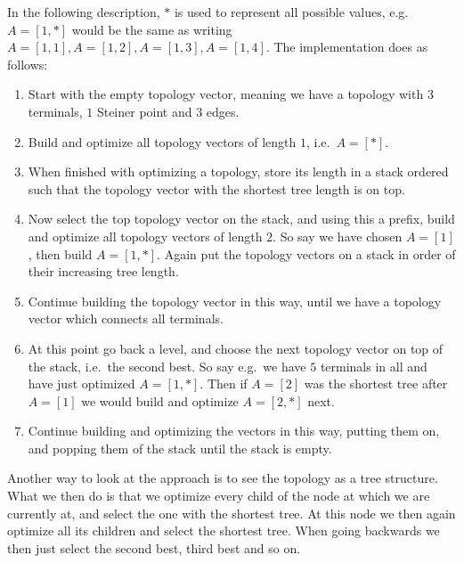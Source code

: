 In the following description, $\ast$ is used to represent all possible values,
e.g.\ $A = [1, \ast]$ would be the same as writing
$A = [1, 1], A = [1, 2], A = [1,3], A = [1, 4]$. The implementation does as
follows:
%
\begin{enumerate}
\item Start with the empty topology vector, meaning we have a topology with $3$
  terminals, $1$ Steiner point and $3$ edges.
\item Build and optimize all topology vectors of length $1$, i.e.\ $A = [\ast]$.
\item When finished with optimizing a topology, store its length in a stack
  ordered such that the topology vector with the shortest tree length is on top.
\item Now select the top topology vector on the stack, and using this a prefix,
  build and optimize all topology vectors of length $2$. So say we have chosen $A = [1]$,
  then build $A = [1, \ast]$. Again put the
  topology vectors on a stack in order of their increasing tree length.
\item Continue building the topology vector in this way, until we have a
  topology vector which connects all terminals.
\item At this point go back a level, and choose the next topology vector on top
  of the stack, i.e.\ the second best. So say e.g.\ we have $5$ terminals in all
  and have just optimized $A = [1, \ast]$. Then if $A = [2]$ was the shortest tree
  after $A = [1]$ we would build and optimize $A = [2, \ast]$ next.
\item Continue building and optimizing the vectors in this way, putting them on,
  and popping them of the stack until the stack is empty.
\end{enumerate}
%
Another way to look at the approach is to see the topology as a tree
structure. What we then do is that we optimize every child of the node at which
we are currently at, and select the one with the shortest tree. At this node we
then again optimize all its children and select the shortest tree. When going
backwards we then just select the second best, third best and so on.

